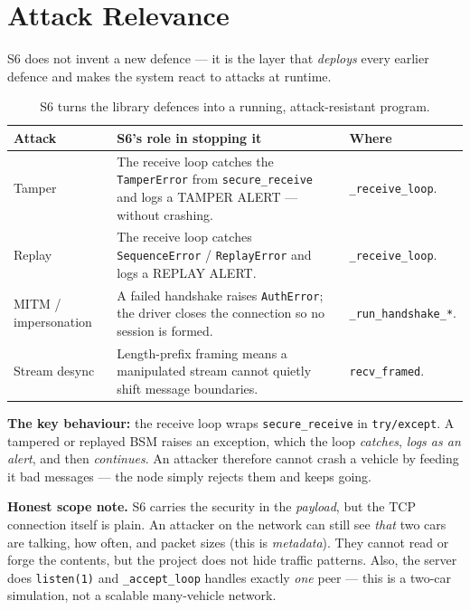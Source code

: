 \documentclass[11pt,a4paper]{article}
\begin{document}
\section{Attack Relevance}

S6 does not invent a new defence --- it is the layer that \emph{deploys} every
earlier defence and makes the system react to attacks at runtime.

\begin{table}[h]
\centering
\small
\begin{tabular}{@{}p{2.7cm} p{5.8cm} p{5.0cm}@{}}
\toprule
\textbf{Attack} & \textbf{S6's role in stopping it} & \textbf{Where}\\
\midrule
Tamper & The receive loop catches the \texttt{TamperError} from
\texttt{secure\_receive} and logs a TAMPER ALERT --- without crashing. &
\texttt{\_receive\_loop}.\\
Replay & The receive loop catches \texttt{SequenceError} /
\texttt{ReplayError} and logs a REPLAY ALERT. & \texttt{\_receive\_loop}.\\
MITM / impersonation & A failed handshake raises \texttt{AuthError}; the driver
closes the connection so no session is formed. & \texttt{\_run\_handshake\_*}.\\
Stream desync & Length-prefix framing means a manipulated stream cannot quietly
shift message boundaries. & \texttt{recv\_framed}.\\
\bottomrule
\end{tabular}
\caption{S6 turns the library defences into a running, attack-resistant program.}
\end{table}

\noindent\textbf{The key behaviour:} the receive loop wraps
\texttt{secure\_receive} in \texttt{try/except}. A tampered or replayed BSM
raises an exception, which the loop \emph{catches}, \emph{logs as an alert}, and
then \emph{continues}. An attacker therefore cannot crash a vehicle by feeding it
bad messages --- the node simply rejects them and keeps going.

\textbf{Honest scope note.} S6 carries the security in the \emph{payload}, but
the TCP connection itself is plain. An attacker on the network can still see
\emph{that} two cars are talking, how often, and packet sizes (this is
\emph{metadata}). They cannot read or forge the contents, but the project does
not hide traffic patterns. Also, the server does \texttt{listen(1)} and
\texttt{\_accept\_loop} handles exactly \emph{one} peer --- this is a two-car
simulation, not a scalable many-vehicle network.
\end{document}
